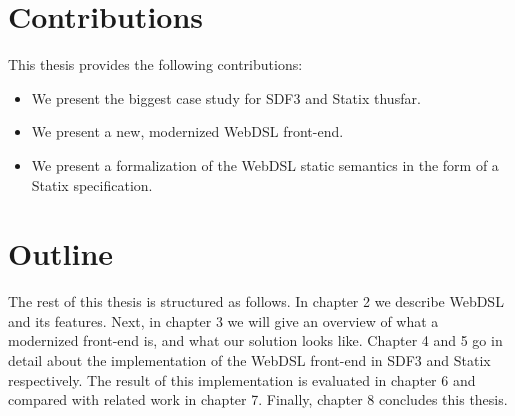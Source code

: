   \section{Contributions}
    This thesis provides the following contributions:

    \begin{itemize}
      \item We present the biggest case study for SDF3 and Statix thusfar.
      \item We present a new, modernized WebDSL front-end.
      \item We present a formalization of the WebDSL static semantics in the form of a Statix specification.
    \end{itemize}

  \section{Outline}
    The rest of this thesis is structured as follows. In chapter 2 we describe WebDSL and its features. Next, in chapter 3 we will give an overview of what a modernized front-end is, and what our solution looks like. Chapter 4 and 5 go in detail about the implementation of the WebDSL front-end in SDF3 and Statix respectively. The result of this implementation is evaluated in chapter 6 and compared with related work in chapter 7. Finally, chapter 8 concludes this thesis.
